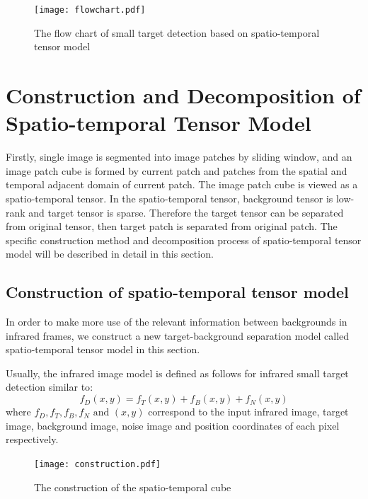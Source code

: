 \documentclass[journal]{IEEEtran}
\begin{document}
\begin{figure}[htb]
  \centering
  \texttt{[image: flowchart.pdf]}
  \caption{The flow chart of small target detection based on spatio-temporal tensor model}
  \label{fig:flow_chart}
\end{figure}


\section{Construction and Decomposition of Spatio-temporal Tensor Model}
Firstly, single image is segmented into image patches by sliding window, and an image patch cube is formed by current patch and patches from the spatial and temporal adjacent domain of current patch. The image patch cube is viewed as a spatio-temporal tensor. In the spatio-temporal tensor, background tensor is low-rank and target tensor is sparse. Therefore the target tensor can be separated from original tensor, then target patch is separated from original patch. The specific construction method and decomposition process of spatio-temporal tensor model will be described in detail in this section.


\subsection{Construction of spatio-temporal tensor model}
In order to make more use of the relevant information between backgrounds in infrared frames, we construct a new target-background separation model called spatio-temporal tensor model in this section. 

Usually, the infrared image model is defined as follows for infrared small target detection similar to\cite{gu2010kernel}:
\begin{equation}
  f_D(x,y)=f_T(x,y)+f_B(x,y)+f_N(x,y)
  \label{eq:image_model}
\end{equation}
where $f_D,f_T,f_B,f_N \text{ and } (x,y)$ correspond to the input infrared image, target image, background image, noise image and position coordinates of each pixel respectively.

\begin{figure}[H]
  \centering
  \texttt{[image: construction.pdf]}
  \caption{The construction of the spatio-temporal cube}
  \label{construction}
\end{figure}
\end{document}
